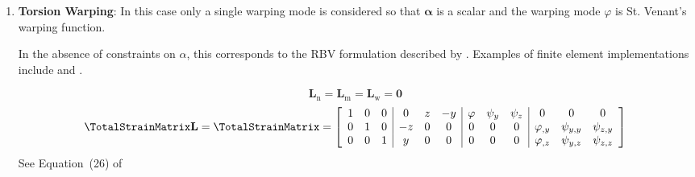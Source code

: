 \begin{enumerate}
\item \textbf{Torsion Warping}: In this case only a single warping mode is considered so that \(\bm{\alpha}\) is a scalar and the warping mode \(\varphi\) is St. Venant's warping function.

In the absence of constraints on \(\alpha\), this corresponds to the RBV formulation described by \cite{armero2021modeling}.
Examples of finite element implementations include \cite{simo1991geometricallyexact} and \cite{gruttmann2000theory}.

$$
  \mathbf{L}_{\mathrm{n}} 
= \mathbf{L}_{\mathrm{m}} 
= \mathbf{L}_{\mathrm{w}} 
= \mathbf{0}
$$
$$
\TotalStrainMatrix\mathbf{L} = \TotalStrainMatrix = \left[\begin{array}{ccc|ccc|ccc|ccc}
1 & 0 & 0 & 0 & z & - y & \varphi & \psi_{y} & \psi_{z} & 0 & 0 & 0 \\
0 & 1 & 0 & - z & 0 & 0 & 0 & 0 & 0 & \varphi_{,y} & \psi_{y,y} & \psi_{z,y}\\
0 & 0 & 1 & y & 0 & 0 & 0 & 0 & 0 & \varphi_{,z} & \psi_{y,z} & \psi_{z,z}
\end{array}\right]
$$
See Equation~(26) of \cite{dire2018mixed}



\end{enumerate}
